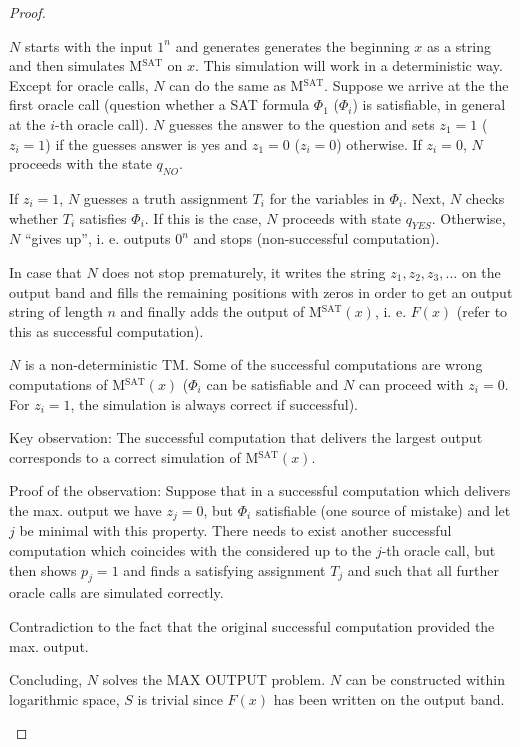 \documentclass[11pt]{article}
\theoremstyle{definition}
\theoremstyle{definition}
\begin{document}
\begin{proof}
\begin{enumerate}
	$ N $ starts with the input $ 1^n $ and generates generates the beginning $ x $ as a string and then simulates M$^{\text{SAT}} $ on $ x $. This simulation will work in a deterministic way. Except for oracle calls, $ N $ can do the same as M$^{\text{SAT}}$. Suppose we arrive at the the first oracle call (question whether a SAT formula $ \Phi_1 $ ($\Phi_i$) is satisfiable, in general at the $i$-th oracle call). $ N $ guesses the answer to the question and sets $ z_1 = 1 $ ($ z_i = 1 $) if the guesses answer is yes and $ z_1 = 0 $ ($ z_i = 0 $) otherwise. If $ z_i = 0$, $ N $ proceeds with the state $ q_{NO} $.
	
	If $ z_i = 1 $, $ N $ guesses a truth assignment $ T_i $ for the variables in $ \Phi_i $. Next, $ N $ checks whether $ T_i $ satisfies $ \Phi_i $. If this is the case, $ N $ proceeds with state $ q_{YES} $. Otherwise, $ N $ ``gives up'', i. e. outputs $ 0^n $ and stops (non-successful computation).
	
	In case that $ N $ does not stop prematurely, it writes the string $ z_1, z_2, z_3, \dots $ on the output band and fills the remaining positions with zeros in order to get an output string of length $ n $ and finally adds the output of M$^\text{SAT}(x)$, i. e. $ F(x) $ (refer to this as successful computation).
	
	$ N $ is a non-deterministic TM. Some of the successful computations are wrong computations of M$^\text{SAT}(x)$ ($ \Phi_i $ can be satisfiable and $ N $ can proceed with $ z_i = 0 $. For $ z_i = 1 $, the simulation is always correct if successful).
	
	Key observation: The successful computation that delivers the largest output corresponds to a correct simulation of M$^\text{SAT}(x)$.
	
	Proof of the observation: Suppose that in a successful computation which delivers the max. output we have $ z_j = 0$, but $ \Phi_i $ satisfiable (one source of mistake) and let $ j $ be minimal with this property. There needs to exist another successful computation which coincides with the considered up to the $ j$-th oracle call, but then shows $ p_j = 1 $ and finds a satisfying assignment $ T_j $ and such that all further oracle calls are simulated correctly.
	
	Contradiction to the fact that the original successful computation provided the max. output.
	
	Concluding, $ N $ solves the MAX OUTPUT problem. $ N $ can be constructed within logarithmic space, $ S $ is trivial since $ F(x) $ has been written on the output band.
\end{enumerate}

\end{proof}
\end{document}
